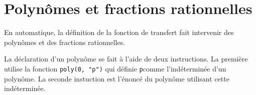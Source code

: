 \section{Polynômes et fractions rationnelles}
En automatique, la définition de la fonction de transfert 
fait intervenir des polynômes et des fractions rationnelles.

La déclaration d'un polynôme se fait à l'aide de deux instructions. 
La première utilise la fonction \verb?poly(0, "p")? qui définie 
\og \verb?p?\fg comme l'indéterminée d'un polynôme. 
La seconde instuction est l'énoncé du polynôme utilisant cette indéterminée. 
